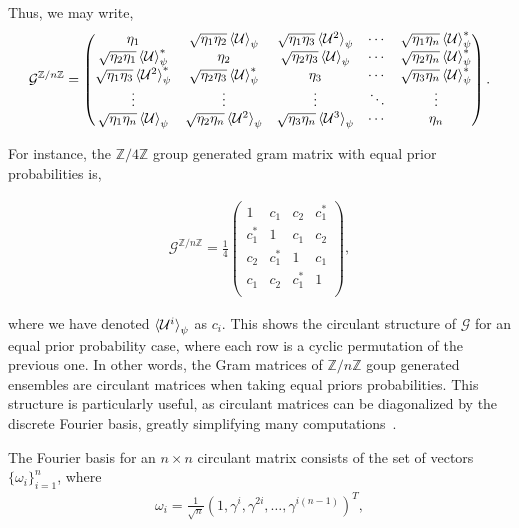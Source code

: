 \documentclass[12pt,letterpaper]{article}
\begin{document}
Thus, we may write,
\begin{align*}
	\mathcal{G}^{\mathbb{Z}/n\mathbb{Z}} = \begin{pmatrix}
 \eta_1 & \sqrt{\eta_1 \eta_2}\braket{\mathcal{U}}_{\psi} & \sqrt{\eta_1 \eta_3}\braket{\mathcal{U}^2}_{\psi} & \cdots & \sqrt{\eta_1 \eta_n}\braket{\mathcal{U}}^*_{\psi} \\
 \sqrt{\eta_2 \eta_1}\braket{\mathcal{U}}^*_{\psi} & \eta_2 & \sqrt{\eta_2 \eta_3}\braket{\mathcal{U}}_{\psi} & \cdots & \sqrt{\eta_2 \eta_n}\braket{\mathcal{U}}^*_{\psi} \\
 \sqrt{\eta_1 \eta_3}\braket{\mathcal{U}^2}^*_{\psi} & \sqrt{\eta_2 \eta_3}\braket{\mathcal{U}}^*_{\psi} & \eta_3 & \cdots & \sqrt{\eta_3 \eta_n}\braket{\mathcal{U}}^*_{\psi} \\
 \vdots & \vdots & \vdots & \ddots & \vdots \\
 \sqrt{\eta_1 \eta_n}\braket{\mathcal{U}}_{\psi} & \sqrt{\eta_2 \eta_n}\braket{\mathcal{U}^{2}}_{\psi} & \sqrt{\eta_3 \eta_n}\braket{\mathcal{U}^{3}}_{\psi} & \cdots & \eta_n
\end{pmatrix}.
\end{align*}

For instance, the $\mathbb{Z}/4\mathbb{Z}$ group generated gram matrix with equal prior probabilities is,

\begin{align*}
\mathcal{G}^{\mathbb{Z}/n\mathbb{Z}} = \frac{1}{4}\begin{pmatrix}1 & c_1 & c_2 & c_1^* \\c_1^* & 1 & c_1 & c_2  \\c_2 & c_1^* & 1 & c_1\\c_1 & c_2 & c_1^* & 1  \\\end{pmatrix},
\end{align*}

where we have denoted $\braket{\mathcal{U}^i}_{\psi}$ as $c_i$. This shows the circulant structure of $\mathcal{G}$ for an equal prior probability case, where each row is a cyclic permutation of the previous one. In other words, the Gram matrices of $\mathbb{Z}/n\mathbb{Z}$ goup generated ensembles are circulant matrices when taking equal priors probabilities. This structure is particularly useful, as circulant matrices can be diagonalized by the discrete Fourier basis, greatly simplifying many computations~\cite{circulantMatrices}.

The Fourier basis for an $n \times n$ circulant matrix consists of the set of vectors $\{\omega_i\}_{i=1}^n$, where
\begin{align*}
	\omega_i = \frac{1}{\sqrt{n}} (1, \gamma^i, \gamma^{2i}, \ldots, \gamma^{i(n-1)})^T,
\end{align*}
\end{document}
